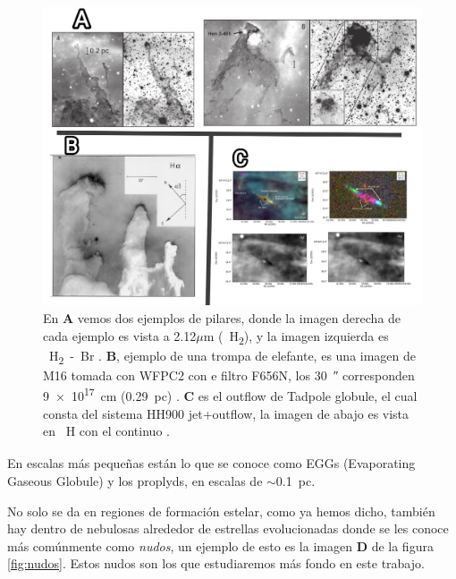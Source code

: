 \documentclass{book}
\begin{document}
\begin{figure}[h]
    \centering
    \includegraphics[width=1 \textwidth]{images Chapter 1/C1_Pillars.jpg}
    \caption{En \textbf{A} vemos dos ejemplos de pilares, donde la imagen derecha de cada ejemplo es vista a 2.12$\mu$m (\SI{}{H_2}), y la imagen izquierda es \SI{}{H_2-Br_{\gamma}} \citep{Hartigan:2015}. \textbf{B}, ejemplo de una trompa de elefante, es una imagen de M16 tomada con WFPC2 con e filtro F656N, los \SI{30}{\arcsecond} corresponden \SI{9e17}{cm} (\SI{0.29}{pc}) \citep{JJHester:1996}. \textbf{C} es el outflow de Tadpole globule, el cual consta del sistema HH900 jet+outflow, la imagen de abajo es vista en \SI{}{H_\alpha} con el continuo 
    \citep{MeganReiter:2019}. }
    \label{fig:Pillars}
\end{figure}

En escalas más pequeñas están lo que se conoce como EGGs (Evaporating Gaseous Globule) y los proplyds, en escalas de $\sim$\SI{0.1}{pc}. 

No solo se da en regiones de formación estelar, como ya hemos dicho, también hay dentro de nebulosas alrededor de estrellas evolucionadas donde se les conoce más comúnmente como \textit{nudos}, un ejemplo de esto es la imagen \textbf{D} de la figura \ref{fig:nudos}. Estos nudos son los que estudiaremos más fondo en este trabajo.
\end{document}
